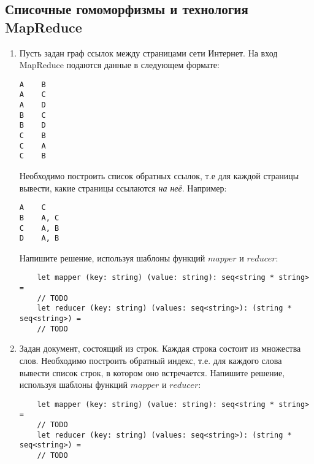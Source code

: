\documentclass[a4paper,11pt]{article}
\renewcommand{\emph}[1]{\textit{#1}}
\newcommand{\<}{\langle}
\renewcommand{\>}{\rangle}
\begin{document}
\subsection*{Списочные гомоморфизмы и технология MapReduce}
\begin{enumerate}
\item Пусть задан граф ссылок между страницами сети Интернет. На вход MapReduce
  подаются данные в следующем формате:
\begin{verbatim}
A    B
A    C
A    D
B    C
B    D
C    B
C    A
C    B
\end{verbatim}
  Необходимо построить список обратных ссылок, т.е для каждой страницы вывести,
  какие страницы ссылаются \emph{на неё}. Например:
\begin{verbatim}
A    C
B    A, C
C    A, B
D    A, B
\end{verbatim}
  Напишите решение, используя шаблоны функций $mapper$ и $reducer$:
  \begin{lstlisting}
    let mapper (key: string) (value: string): seq<string * string> =
    // TODO
    let reducer (key: string) (values: seq<string>): (string * seq<string>) =
    // TODO
  \end{lstlisting}

\item Задан документ, состоящий из строк. Каждая строка состоит из множества
  слов. Необходимо построить обратный индекс, т.е. для каждого слова вывести
  список строк, в котором оно встречается. Напишите решение, используя шаблоны
  функций $mapper$ и $reducer$:
  \begin{lstlisting}
    let mapper (key: string) (value: string): seq<string * string> =
    // TODO
    let reducer (key: string) (values: seq<string>): (string * seq<string>) =
    // TODO
  \end{lstlisting}
\end{enumerate}
\end{document}
